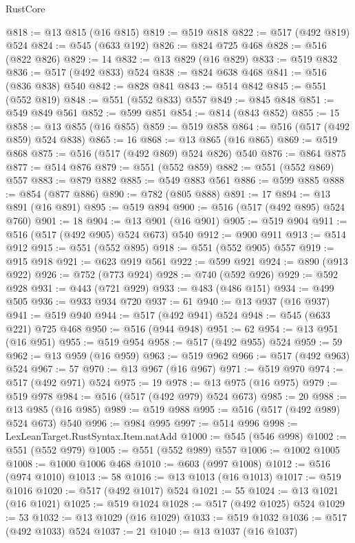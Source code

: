 \begin{lexlean}{RustCore}
\begin{coremodule}
@818 := @13 @815 (@16 @815)
@819 := @519 @818
@822 := @517 (@492 @819) @524
@824 := @545 (@633 @192)
@826 := @824 @725 @468
@828 := @516 (@822 @826)
@829 := 14
@832 := @13 @829 (@16 @829)
@833 := @519 @832
@836 := @517 (@492 @833) @524
@838 := @824 @638 @468
@841 := @516 (@836 @838) @540
@842 := @828 @841
@843 := @514 @842
@845 := @551 (@552 @819)
@848 := @551 (@552 @833) @557
@849 := @845 @848
@851 := @549 @849 @561
@852 := @599 @851
@854 := @814 (@843 @852)
@855 := 15
@858 := @13 @855 (@16 @855)
@859 := @519 @858
@864 := @516 (@517 (@492 @859) @524 @838)
@865 := 16
@868 := @13 @865 (@16 @865)
@869 := @519 @868
@875 := @516 (@517 (@492 @869) @524 @826) @540
@876 := @864 @875
@877 := @514 @876
@879 := @551 (@552 @859)
@882 := @551 (@552 @869) @557
@883 := @879 @882
@885 := @549 @883 @561
@886 := @599 @885
@888 := @854 (@877 @886)
@890 := @782 (@805 @888)
@891 := 17
@894 := @13 @891 (@16 @891)
@895 := @519 @894
@900 := @516 (@517 (@492 @895) @524 @760)
@901 := 18
@904 := @13 @901 (@16 @901)
@905 := @519 @904
@911 := @516 (@517 (@492 @905) @524 @673) @540
@912 := @900 @911
@913 := @514 @912
@915 := @551 (@552 @895)
@918 := @551 (@552 @905) @557
@919 := @915 @918
@921 := @623 @919 @561
@922 := @599 @921
@924 := @890 (@913 @922)
@926 := @752 (@773 @924)
@928 := @740 (@592 @926)
@929 := @592 @928
@931 := @443 (@721 @929)
@933 := @483 (@486 @151)
@934 := @499 @505
@936 := @933 @934 @720
@937 := 61
@940 := @13 @937 (@16 @937)
@941 := @519 @940
@944 := @517 (@492 @941) @524
@948 := @545 (@633 @221) @725 @468
@950 := @516 (@944 @948)
@951 := 62
@954 := @13 @951 (@16 @951)
@955 := @519 @954
@958 := @517 (@492 @955) @524
@959 := 59
@962 := @13 @959 (@16 @959)
@963 := @519 @962
@966 := @517 (@492 @963) @524
@967 := 57
@970 := @13 @967 (@16 @967)
@971 := @519 @970
@974 := @517 (@492 @971) @524
@975 := 19
@978 := @13 @975 (@16 @975)
@979 := @519 @978
@984 := @516 (@517 (@492 @979) @524 @673)
@985 := 20
@988 := @13 @985 (@16 @985)
@989 := @519 @988
@995 := @516 (@517 (@492 @989) @524 @673) @540
@996 := @984 @995
@997 := @514 @996
@998 := LexLeanTarget.RustSyntax.Item.natAdd
@1000 := @545 (@546 @998)
@1002 := @551 (@552 @979)
@1005 := @551 (@552 @989) @557
@1006 := @1002 @1005
@1008 := @1000 @1006 @468
@1010 := @603 (@997 @1008)
@1012 := @516 (@974 @1010)
@1013 := 58
@1016 := @13 @1013 (@16 @1013)
@1017 := @519 @1016
@1020 := @517 (@492 @1017) @524
@1021 := 55
@1024 := @13 @1021 (@16 @1021)
@1025 := @519 @1024
@1028 := @517 (@492 @1025) @524
@1029 := 53
@1032 := @13 @1029 (@16 @1029)
@1033 := @519 @1032
@1036 := @517 (@492 @1033) @524
@1037 := 21
@1040 := @13 @1037 (@16 @1037)

\end{coremodule}
\end{lexlean}
